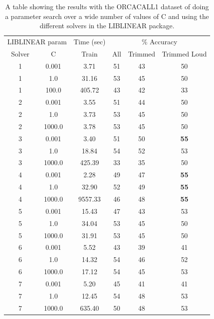 \documentclass[12pt,oneside]{book}
\begin{document}
\begin{table}
\begin{tabular}{|c|c|c|c|c|c|}
\hline
\multicolumn{2}{|c|}{LIBLINEAR param} & \multicolumn{1}{c|}{Time (sec)} & \multicolumn{3}{c|}{\% Accuracy} \\
\hhline{|-|-|-|-|-|-|}
Solver & C & Train & All & Trimmed & Trimmed Loud \\
\hhline{|=|=|=|=|=|=|}
1 & 0.001   &       3.71  &    51  &  43  &  50 \\
1 & 1.0     &      31.16  &    53  &  45  &  50 \\
1 & 100.0   &     405.72  &    43  &  42  &  33 \\
2 & 0.001   &       3.55  &    51  &  44  &  50 \\
2 & 1.0     &       3.73  &    53  &  45  &  50 \\
2 & 1000.0  &       3.78  &    53  &  45  &  50 \\
\hline
3 & 0.001   &       3.40  &    51  &  50  &  \textbf{55} \\
3 & 1.0     &      18.84  &    54  &  52  &  53 \\
3 & 1000.0  &     425.39  &    33  &  35  &  50 \\
4 & 0.001   &       2.28  &    49  &  47  &  \textbf{55} \\
4 & 1.0     &      32.90  &    52  &  49  &  \textbf{55} \\
4 & 1000.0  &    9557.33  &    46  &  48  &  \textbf{55} \\
\hline
5 & 0.001   &      15.43  &    47   &  43  &  53 \\
5 & 1.0     &      34.04  &    53   &  45  &  50 \\
5 & 1000.0  &      31.91  &    53   &  45  &  50 \\
6 & 0.001   &       5.52  &    43   &  39  &  41 \\
6 & 1.0     &      14.32  &    54   &  46  &  52 \\
6 & 1000.0  &      17.12  &    54   &  45  &  53 \\
7 & 0.001   &       5.20  &    45   &  41  &  41 \\
7 & 1.0     &      12.45  &    54   &  48  &  53 \\
7 & 1000.0  &     635.40  &    50   &  48  &  53 \\
\hline
\end{tabular}
\caption{A table showing the results with the ORCACALL1 dataset of
  doing a parameter search over a wide number of values of C and using
  the different solvers in the LIBLINEAR package.}
\label{table:calls-liblinear}
\end{table}
\end{document}
